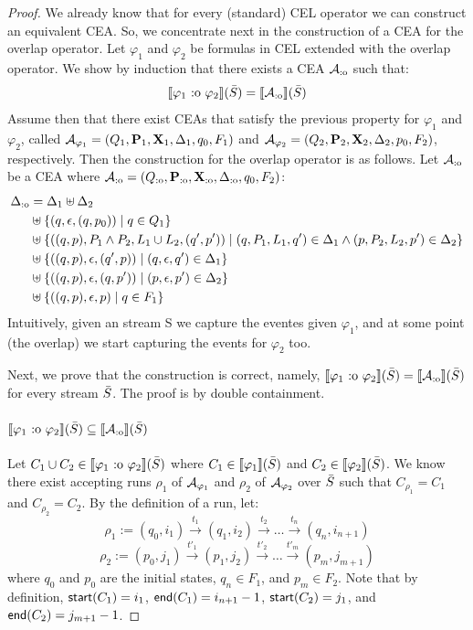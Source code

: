 \begin{proof}
We already know that for every (standard) CEL operator we can construct an equivalent CEA. So, we concentrate next in the construction of a CEA for the overlap operator. 
Let $\varphi_1$ and $\varphi_2$ be formulas in CEL extended with the overlap operator. We show by induction that there exists a CEA $\mathcal{A}_{\text{:o}}$ such that:
\[
\sem{\varphi_1 \overlap \varphi_2}(\Stream) = \sem{\cAoverlap}(\Stream)
\]
Assume then that there exist CEAs that satisfy the previous property for $\varphi_1$ and $\varphi_2$, called $\mathcal{A}_{\varphi_1} = (Q_1, \mathbf{P}_1, \mathbf{X}_1, \Delta_1, q_0, F_1)$ and $\mathcal{A}_{\varphi_2} = (Q_2, \mathbf{P}_2, \mathbf{X}_2, \Delta_2, p_0, F_2)$, respectively. 
Then the construction for the overlap operator is as follows.
Let $\mathcal{A}_{\text{:o}}$ be a CEA where $\mathcal{A}_{\text{:o}} = (Q_{\text{:o}}, \mathbf{P}_{\text{:o}}, \mathbf{X}_{\text{:o}}, \Delta_{\text{:o}}, q_0, F_2)$:
\[
	\begin{aligned}[t]
		\Delta_{\text{:o}} & = \Delta_1 \uplus \Delta_2 \\
		& \uplus \{(q, \epsilon, (q, p_0)) \mid q \in Q_1\} \\
		& \uplus \{((q, p), P_1 \land P_2, L_1 \cup L_2, (q', p')) \mid (q, P_1, L_1, q') \in \Delta_1 \land (p, P_2, L_2, p') \in \Delta_2\} \\
		& \uplus \{((q, p), \epsilon, (q', p)) \mid (q, \epsilon, q') \in \Delta_1\}  \\
		& \uplus \{((q, p), \epsilon, (q, p')) \mid (p, \epsilon, p') \in \Delta_2\}  \\
		& \uplus \{((q, p), \epsilon, p) \mid q \in F_1\} 
	\end{aligned}
\]
Intuitively, given an stream S we capture the eventes given $\varphi_1$, and at some point (the overlap) we start capturing the events for $\varphi_2$ too.

Next, we prove that the construction is correct, namely, $\sem{\varphi_1 \overlap \varphi_2}(\Stream) = \sem{\cAoverlap}(\Stream)$ for every stream $\bar{S}$. The proof is by double containment. 

\paragraph{$\sem{\varphi_1 \overlap \varphi_2}(\Stream) \subseteq \sem{\cAoverlap}(\Stream)$}
Let $C_1 \cup C_2 \in \sem{\varphi_1 \overlap \varphi_2}(\Stream)$ where $C_1 \in \sem{\varphi_1}(\Stream)$ and $C_2 \in \sem{\varphi_2}(\Stream)$. We know there exist accepting runs $\rho_1$ of $\mathcal{A}_{\varphi_1}$ and $\rho_2$ of $\mathcal{A}_{\varphi_2}$ over $\bar{S}$ such that $C_{\rho_1} = C_1$ and $C_{\rho_2} = C_2$.
By the definition of a run, let:
\[ \rho_1 := (q_0, i_1) \xrightarrow{t_1} (q_1, i_2) \xrightarrow{t_2} \dots \xrightarrow{t_n} (q_{n}, i_{n+1}) \]
\[ \rho_2 := (p_0, j_1) \xrightarrow{t'_1} (p_1, j_2) \xrightarrow{t'_2} \dots \xrightarrow{t'_m} (p_{m}, j_{m+1}) \]
where $q_0$ and $p_0$ are the initial states, $q_{n} \in F_1$, and $p_{m} \in F_2$. Note that by definition, $\mathsf{start}(C_1) = i_1$, $\mathsf{end}(C_1) = i_{n+1} - 1$, $\mathsf{start}(C_2) = j_1$, and $\mathsf{end}(C_2) = j_{m+1} - 1$.


\end{proof}
